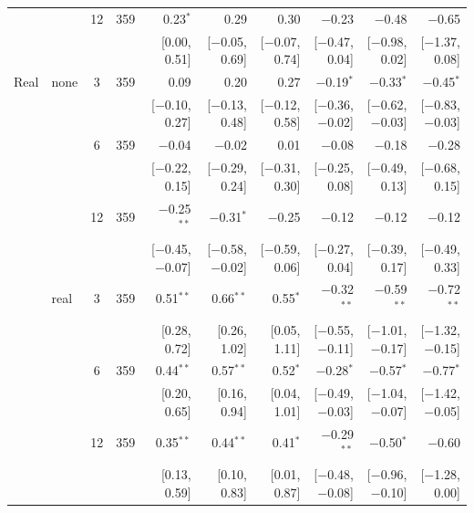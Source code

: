 \begin{longtable}{llcrrrrrrr}
 &  & 12 & 359 & 0.23$^{*}$ & 0.29 & 0.30 & $-$0.23 & $-$0.48 & $-$0.65\\
 & & & & {\scriptsize [0.00, 0.51]} & {\scriptsize [$-$0.05, 0.69]} & {\scriptsize [$-$0.07, 0.74]} & {\scriptsize [$-$0.47, 0.04]} & {\scriptsize [$-$0.98, 0.02]} & {\scriptsize [$-$1.37, 0.08]}\\
\addlinespace
Real & none & 3 & 359 & 0.09 & 0.20 & 0.27 & $-$0.19$^{*}$ & $-$0.33$^{*}$ & $-$0.45$^{*}$\\
 & & & & {\scriptsize [$-$0.10, 0.27]} & {\scriptsize [$-$0.13, 0.48]} & {\scriptsize [$-$0.12, 0.58]} & {\scriptsize [$-$0.36, $-$0.02]} & {\scriptsize [$-$0.62, $-$0.03]} & {\scriptsize [$-$0.83, $-$0.03]}\\
 &  & 6 & 359 & $-$0.04 & $-$0.02 & 0.01 & $-$0.08 & $-$0.18 & $-$0.28\\
 & & & & {\scriptsize [$-$0.22, 0.15]} & {\scriptsize [$-$0.29, 0.24]} & {\scriptsize [$-$0.31, 0.30]} & {\scriptsize [$-$0.25, 0.08]} & {\scriptsize [$-$0.49, 0.13]} & {\scriptsize [$-$0.68, 0.15]}\\
 &  & 12 & 359 & $-$0.25$^{**}$ & $-$0.31$^{*}$ & $-$0.25 & $-$0.12 & $-$0.12 & $-$0.12\\
 & & & & {\scriptsize [$-$0.45, $-$0.07]} & {\scriptsize [$-$0.58, $-$0.02]} & {\scriptsize [$-$0.59, 0.06]} & {\scriptsize [$-$0.27, 0.04]} & {\scriptsize [$-$0.39, 0.17]} & {\scriptsize [$-$0.49, 0.33]}\\
 & real & 3 & 359 & 0.51$^{**}$ & 0.66$^{**}$ & 0.55$^{*}$ & $-$0.32$^{**}$ & $-$0.59$^{**}$ & $-$0.72$^{**}$\\
 & & & & {\scriptsize [0.28, 0.72]} & {\scriptsize [0.26, 1.02]} & {\scriptsize [0.05, 1.11]} & {\scriptsize [$-$0.55, $-$0.11]} & {\scriptsize [$-$1.01, $-$0.17]} & {\scriptsize [$-$1.32, $-$0.15]}\\
 &  & 6 & 359 & 0.44$^{**}$ & 0.57$^{**}$ & 0.52$^{*}$ & $-$0.28$^{*}$ & $-$0.57$^{*}$ & $-$0.77$^{*}$\\
 & & & & {\scriptsize [0.20, 0.65]} & {\scriptsize [0.16, 0.94]} & {\scriptsize [0.04, 1.01]} & {\scriptsize [$-$0.49, $-$0.03]} & {\scriptsize [$-$1.04, $-$0.07]} & {\scriptsize [$-$1.42, $-$0.05]}\\
 &  & 12 & 359 & 0.35$^{**}$ & 0.44$^{**}$ & 0.41$^{*}$ & $-$0.29$^{**}$ & $-$0.50$^{*}$ & $-$0.60\\
 & & & & {\scriptsize [0.13, 0.59]} & {\scriptsize [0.10, 0.83]} & {\scriptsize [0.01, 0.87]} & {\scriptsize [$-$0.48, $-$0.08]} & {\scriptsize [$-$0.96, $-$0.10]} & {\scriptsize [$-$1.28, 0.00]}\\

\end{longtable}
